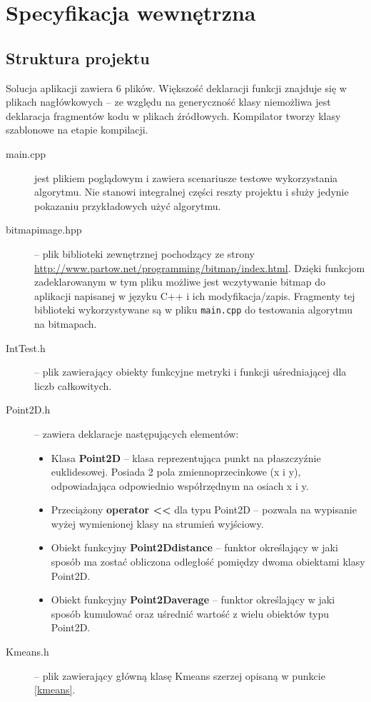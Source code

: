 \section{Specyfikacja wewnętrzna}

\subsection{Struktura projektu}

Solucja aplikacji zawiera 6 plików. Większość deklaracji funkcji znajduje się w plikach nagłówkowych -- ze względu na generyczność klasy niemożliwa jest deklaracja fragmentów kodu w plikach źródłowych. Kompilator tworzy klasy szablonowe na etapie kompilacji.

\begin{description}
	\item[main.cpp] jest plikiem poglądowym i zawiera scenariusze testowe wykorzystania algorytmu. Nie stanowi integralnej części reszty projektu i służy jedynie pokazaniu przykładowych użyć algorytmu.
	\item[bitmap\textunderscore image.hpp] -- plik biblioteki zewnętrznej pochodzący ze strony \url{http://www.partow.net/programming/bitmap/index.html}. Dzięki funkcjom zadeklarowanym w tym pliku możliwe jest wczytywanie bitmap do aplikacji napisanej w języku C++ i ich modyfikacja/zapis. Fragmenty tej biblioteki wykorzystywane są w pliku \texttt{main.cpp} do testowania algorytmu na bitmapach.
	\item[IntTest.h] -- plik zawierający obiekty funkcyjne metryki i funkcji uśredniającej dla liczb całkowitych.
	\item[Point\textunderscore 2D.h] -- zawiera deklaracje następujących elementów:
	\begin{itemize}
		\item Klasa \textbf{Point\textunderscore 2D} -- klasa reprezentująca punkt na płaszczyźnie euklidesowej. Posiada 2 pola zmiennoprzecinkowe (x i y), odpowiadająca odpowiednio współrzędnym na osiach x i y.
		\item Przeciążony \textbf{operator <<} dla typu Point\textunderscore 2D -- pozwala na wypisanie wyżej wymienionej klasy na strumień wyjściowy.
		\item Obiekt funkcyjny \textbf{Point2D\textunderscore distance} -- funktor określający w jaki sposób ma zostać obliczona odległość pomiędzy dwoma obiektami klasy Point\textunderscore 2D.
		\item Obiekt funkcyjny \textbf{Point2D\textunderscore average} -- funktor określający w jaki sposób kumulować oraz uśrednić wartość z wielu obiektów typu Point\textunderscore 2D.
	\end{itemize}
	\item[K\textunderscore means.h] -- plik zawierający główną klasę K\textunderscore means szerzej opisaną w punkcie \ref{kmeans}.
\end{description}

